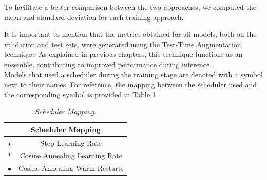 To facilitate a better comparison between the two approaches, we computed the
mean and standard deviation for each training approach.

\newpage

It is important to mention that the metrics obtained for all models, both on
the validation and test sets, were generated using the Test-Time Augmentation
technique. As explained in previous chapters, this technique functions as an
ensemble, contributing to improved performance during inference. \\

Models that used a scheduler during the training stage are denoted with a
symbol next to their names. For reference, the mapping between the scheduler
used and the corresponding symbol is provided in Table
\ref{table:scheduler-mapping}.

\begin{table}[H]
  \centering
  \begin{tabular}{cc}
    \toprule
    \multicolumn{2}{c}{\textbf{Scheduler Mapping}} \\
    \midrule
    $\star$     & Step Learning Rate \\
    $\ast$      & Cosine Annealing Learning Rate \\
    $\bullet$   & Cosine Annealing Warm Restarts \\
    \bottomrule
  \end{tabular}
  \caption[Scheduler Mapping]
  {\textit{Scheduler Mapping.}}
  \label{table:scheduler-mapping}
\end{table}

\newpage

